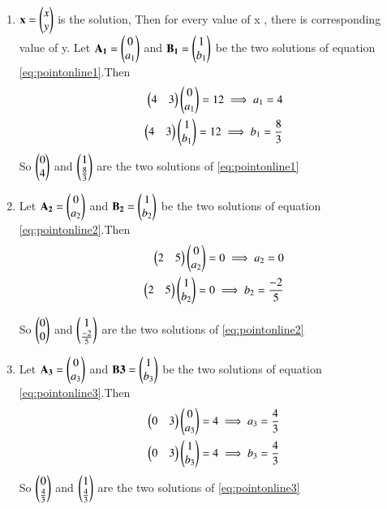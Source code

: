 \renewcommand{\theequation}{\theenumi}
\begin{enumerate}[label=\thesection.\arabic*.,ref=\thesection.\theenumi]

\item $\mathbf{x}=\begin{pmatrix}x\\y\end{pmatrix}$ is the solution, Then for every value of x , there is corresponding value of y. 
Let $\mathbf{A_1}=\begin{pmatrix}0\\a_1\end{pmatrix}$ and $\mathbf{B_1}=\begin{pmatrix}1\\b_1\end{pmatrix}$ be the two solutions of equation \ref{eq:pointonline1}.Then
\begin{align}
 \begin{pmatrix}4&3\end{pmatrix}\begin{pmatrix}0\\a_1\end{pmatrix}=12
 \implies a_1=4
 \\
 \begin{pmatrix}4&3\end{pmatrix}\begin{pmatrix}1\\b_1\end{pmatrix}=12
 \implies b_1=\frac{8}{3}
\end{align}
So $\begin{pmatrix}0\\4\end{pmatrix}$ and $\begin{pmatrix}1\\\frac{8}{3}\end{pmatrix}$ are the two solutions of \ref{eq:pointonline1}

\item 
Let $\mathbf{A_2}=\begin{pmatrix}0\\a_2\end{pmatrix}$ and $\mathbf{B_2}=\begin{pmatrix}1\\b_2\end{pmatrix}$ be the two solutions of equation \ref{eq:pointonline2}.Then
\begin{align}
 \begin{pmatrix}2&5\end{pmatrix}\begin{pmatrix}0\\a_2\end{pmatrix}=0
 \implies a_2=0
 \\
 \begin{pmatrix}2&5\end{pmatrix}\begin{pmatrix}1\\b_2\end{pmatrix}=0
 \implies b_2=\frac{-2}{5}
\end{align}

So $\begin{pmatrix}0\\0\end{pmatrix}$ and $\begin{pmatrix}1\\\frac{-2}{5}\end{pmatrix}$ are the two solutions of \ref{eq:pointonline2}
\item 
Let $\mathbf{A_3}=\begin{pmatrix}0\\a_3\end{pmatrix}$ and $\mathbf{B3}=\begin{pmatrix}1\\b_3\end{pmatrix}$ be the two solutions of equation \ref{eq:pointonline3}.Then
\begin{align}
 \begin{pmatrix}0&3\end{pmatrix}\begin{pmatrix}0\\a_3\end{pmatrix}=4
 \implies a_3=\frac{4}{3}
 \\
 \begin{pmatrix}0&3\end{pmatrix}\begin{pmatrix}1\\b_3\end{pmatrix}=4
 \implies b_3=\frac{4}{3}
\end{align}
So $\begin{pmatrix}0\\\frac{4}{3}\end{pmatrix}$ and $\begin{pmatrix}1\\\frac{4}{3}\end{pmatrix}$ are the two solutions of \ref{eq:pointonline3}


\end{enumerate}
